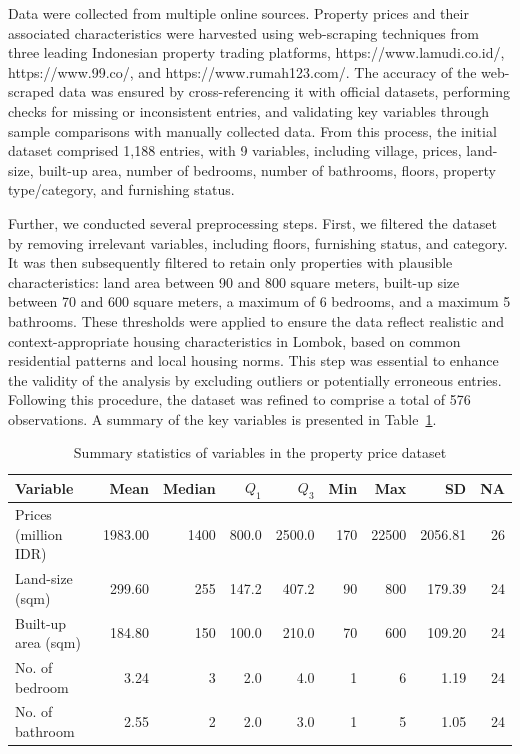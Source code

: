 \documentclass[
  default,
]{sn-jnl}
\begin{document}
Data were collected from multiple online sources. Property prices and
their associated characteristics were harvested using web-scraping
techniques from three leading Indonesian property trading platforms,
https://www.lamudi.co.id/, https://www.99.co/, and
https://www.rumah123.com/. The accuracy of the web-scraped data was
ensured by cross-referencing it with official datasets, performing
checks for missing or inconsistent entries, and validating key variables
through sample comparisons with manually collected data. From this
process, the initial dataset comprised 1,188 entries, with 9 variables,
including village, prices, land-size, built-up area, number of bedrooms,
number of bathrooms, floors, property type/category, and furnishing
status.

Further, we conducted several preprocessing steps. First, we filtered
the dataset by removing irrelevant variables, including floors,
furnishing status, and category. It was then subsequently filtered to
retain only properties with plausible characteristics: land area between
90 and 800 square meters, built-up size between 70 and 600 square
meters, a maximum of 6 bedrooms, and a maximum 5 bathrooms. These
thresholds were applied to ensure the data reflect realistic and
context-appropriate housing characteristics in Lombok, based on common
residential patterns and local housing norms. This step was essential to
enhance the validity of the analysis by excluding outliers or
potentially erroneous entries. Following this procedure, the dataset was
refined to comprise a total of 576 observations. A summary of the key
variables is presented in Table~\ref{tbl-datasumm}.

\begingroup\fontsize{9}{11}\selectfont

\begin{longtable}[t]{lrrrrrrrr}

\caption{\label{tbl-datasumm}Summary statistics of variables in the
property price dataset}

\tabularnewline

\toprule
Variable & Mean & Median & $Q_1$ & $Q_3$ & Min & Max & SD & NA\\
\midrule
Prices (million IDR) & 1983.00 & 1400 & 800.0 & 2500.0 & 170 & 22500 & 2056.81 & 26\\
Land-size (sqm) & 299.60 & 255 & 147.2 & 407.2 & 90 & 800 & 179.39 & 24\\
Built-up area (sqm) & 184.80 & 150 & 100.0 & 210.0 & 70 & 600 & 109.20 & 24\\
No. of bedroom & 3.24 & 3 & 2.0 & 4.0 & 1 & 6 & 1.19 & 24\\
No. of bathroom & 2.55 & 2 & 2.0 & 3.0 & 1 & 5 & 1.05 & 24\\
\bottomrule

\end{longtable}
\end{document}
